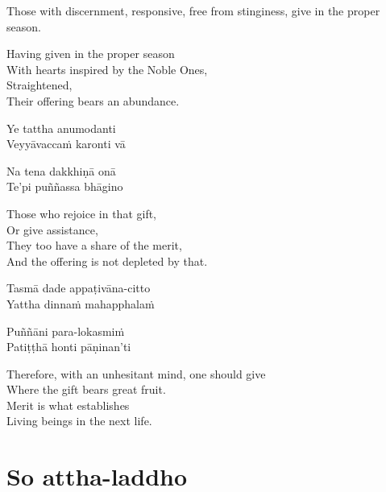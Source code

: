 \begin{english-verses}
  \begin{english-hangtogether}
    Those with discernment, responsive, free from stinginess, give in the proper season.
  \end{english-hangtogether}
  Having given in the proper season\\
  With hearts inspired by the Noble Ones,\\
  Straightened,\\
  Their offering bears an abundance.
\end{english-verses}

\begin{pali-hang}
  Ye tattha anumodanti\\
  Veyyāvaccaṁ karonti vā
\end{pali-hang}
\begin{pali-hangtogether}
  Na tena dakkhiṇā onā\\
  Te'pi puññassa bhāgino
\end{pali-hangtogether}

\begin{english-verses}
  Those who rejoice in that gift,\\
  Or give assistance,\\
  They too have a share of the merit,\\
  And the offering is not depleted by that.
\end{english-verses}

\begin{pali-hang}
  Tasmā dade appaṭivāna-citto\\
  Yattha dinnaṁ mahapphalaṁ
\end{pali-hang}
\begin{pali-hangtogether}
  Puññāni para-lokasmiṁ\\
  Patiṭṭhā honti pāṇinan'ti
\end{pali-hangtogether}

\begin{english-verses}
  Therefore, with an unhesitant mind, one should give\\
  Where the gift bears great fruit.\\
  Merit is what establishes\\
  Living beings in the next life.
\end{english-verses}

\suttaRef{[AN 5.36]}

\section{So attha-laddho}
\label{so-attha-laddho}


